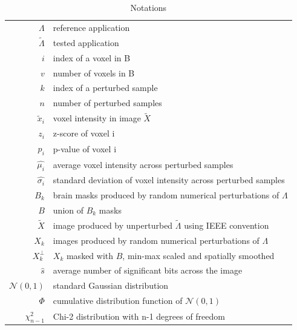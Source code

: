 \documentclass[lettersize,journal]{IEEEtran}
\begin{document}
{\begin{table}
  \centering
  \begin{tabular}{r|l}
    $\Lambda$          & reference application                                                \\
    $\tilde \Lambda$   & tested application                                                   \\
    $i$                & index of a voxel in B                                                \\
    $v$                & number of voxels in B                                                \\
    $k$                & index of a perturbed sample                                          \\
    $n$                & number of perturbed samples                                          \\
    $\tilde x_i$       & voxel intensity in image $\tilde X$                                  \\
    $z_i$              & z-score of voxel i                                                   \\
    $p_i$              & p-value of voxel i                                                   \\
    $\hat{\mu_i}$      & average voxel intensity across perturbed samples                     \\
    $\hat{\sigma_i}$   & standard deviation of voxel intensity across perturbed samples       \\
    $B_k$              & brain masks produced by random numerical perturbations of $\Lambda$  \\
    $B$                & union of $B_k$ masks                                                 \\
    $\tilde X$         & image produced by unperturbed $\tilde \Lambda$ using IEEE convention \\
    $X_k$              & images produced by random numerical perturbations of $\Lambda$       \\
    $X_k^{\perp}$      & $X_k$ masked with $B$, min-max scaled and spatially smoothed         \\
    $\hat{s}$          & average number of significant bits across the image                  \\
    $\mathcal{N}(0,1)$ & standard Gaussian distribution                                       \\
    $\Phi$             & cumulative distribution function of $\mathcal{N}(0,1)$               \\
    $\chi^2_{n-1}$     & Chi-2 distribution with n-1 degrees of freedom                       \\
  \end{tabular}
  \caption{Notations}
  \label{tab:notations}
\end{table}

}
\end{document}
